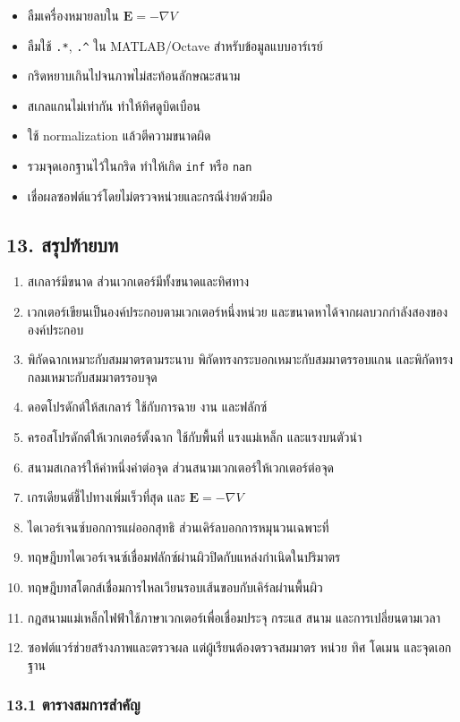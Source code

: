 \begin{itemize}
\item ลืมเครื่องหมายลบใน \(\mathbf{E}=-\nabla V\)
\item ลืมใช้ \texttt{.*}, \texttt{.\^{}} ใน MATLAB/Octave สำหรับข้อมูลแบบอาร์เรย์
\item กริดหยาบเกินไปจนภาพไม่สะท้อนลักษณะสนาม
\item สเกลแกนไม่เท่ากัน ทำให้ทิศดูบิดเบือน
\item ใช้ normalization แล้วตีความขนาดผิด
\item รวมจุดเอกฐานไว้ในกริด ทำให้เกิด \texttt{inf} หรือ \texttt{nan}
\item เชื่อผลซอฟต์แวร์โดยไม่ตรวจหน่วยและกรณีง่ายด้วยมือ
\end{itemize}

\subsection{13. สรุปท้ายบท}

\begin{enumerate}
\item สเกลาร์มีขนาด ส่วนเวกเตอร์มีทั้งขนาดและทิศทาง
\item เวกเตอร์เขียนเป็นองค์ประกอบตามเวกเตอร์หนึ่งหน่วย และขนาดหาได้จากผลบวกกำลังสองขององค์ประกอบ
\item พิกัดฉากเหมาะกับสมมาตรตามระนาบ พิกัดทรงกระบอกเหมาะกับสมมาตรรอบแกน และพิกัดทรงกลมเหมาะกับสมมาตรรอบจุด
\item ดอตโปรดักต์ให้สเกลาร์ ใช้กับการฉาย งาน และฟลักซ์
\item ครอสโปรดักต์ให้เวกเตอร์ตั้งฉาก ใช้กับพื้นที่ แรงแม่เหล็ก และแรงบนตัวนำ
\item สนามสเกลาร์ให้ค่าหนึ่งค่าต่อจุด ส่วนสนามเวกเตอร์ให้เวกเตอร์ต่อจุด
\item เกรเดียนต์ชี้ไปทางเพิ่มเร็วที่สุด และ \(\mathbf{E}=-\nabla V\)
\item ไดเวอร์เจนซ์บอกการแผ่ออกสุทธิ ส่วนเคิร์ลบอกการหมุนวนเฉพาะที่
\item ทฤษฎีบทไดเวอร์เจนซ์เชื่อมฟลักซ์ผ่านผิวปิดกับแหล่งกำเนิดในปริมาตร
\item ทฤษฎีบทสโตกส์เชื่อมการไหลเวียนรอบเส้นขอบกับเคิร์ลผ่านพื้นผิว
\item กฎสนามแม่เหล็กไฟฟ้าใช้ภาษาเวกเตอร์เพื่อเชื่อมประจุ กระแส สนาม และการเปลี่ยนตามเวลา
\item ซอฟต์แวร์ช่วยสร้างภาพและตรวจผล แต่ผู้เรียนต้องตรวจสมมาตร หน่วย ทิศ โดเมน และจุดเอกฐาน
\end{enumerate}

\subsubsection{13.1 ตารางสมการสำคัญ}

